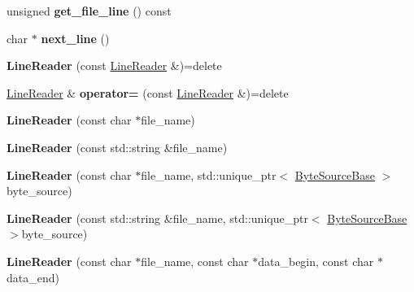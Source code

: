 \begin{DoxyCompactItemize}
\item 
\mbox{\label{classio_1_1_line_reader_a3f3459e22ed8e459238c290050b6722e}} 
unsigned {\bfseries get\+\_\+file\+\_\+line} () const
\item 
\mbox{\label{classio_1_1_line_reader_a97f4e0129611d9da2b8c966ffe670be5}} 
char $\ast$ {\bfseries next\+\_\+line} ()
\item 
\mbox{\label{classio_1_1_line_reader_a84f2957de769bb701eaaddfd8bc004dd}} 
{\bfseries Line\+Reader} (const \hyperlink{classio_1_1_line_reader}{Line\+Reader} \&)=delete
\item 
\mbox{\label{classio_1_1_line_reader_a9ebd7beca16060ffc0ea8df3c0c6ff25}} 
\hyperlink{classio_1_1_line_reader}{Line\+Reader} \& {\bfseries operator=} (const \hyperlink{classio_1_1_line_reader}{Line\+Reader} \&)=delete
\item 
\mbox{\label{classio_1_1_line_reader_a81a75d3f53725d35822f490007520e29}} 
{\bfseries Line\+Reader} (const char $\ast$file\+\_\+name)
\item 
\mbox{\label{classio_1_1_line_reader_ab0eb26f44fa6b18f9c39dfb2561ac882}} 
{\bfseries Line\+Reader} (const std\+::string \&file\+\_\+name)
\item 
\mbox{\label{classio_1_1_line_reader_af4ebb130a7d6c78356573f6d0304266c}} 
{\bfseries Line\+Reader} (const char $\ast$file\+\_\+name, std\+::unique\+\_\+ptr$<$ \hyperlink{classio_1_1_byte_source_base}{Byte\+Source\+Base} $>$byte\+\_\+source)
\item 
\mbox{\label{classio_1_1_line_reader_ab625b3a8001dca811b0e211c6cfc1b28}} 
{\bfseries Line\+Reader} (const std\+::string \&file\+\_\+name, std\+::unique\+\_\+ptr$<$ \hyperlink{classio_1_1_byte_source_base}{Byte\+Source\+Base} $>$byte\+\_\+source)
\item 
\mbox{\label{classio_1_1_line_reader_ad5a65d6f23474884061a77ea858c042b}} 
{\bfseries Line\+Reader} (const char $\ast$file\+\_\+name, const char $\ast$data\+\_\+begin, const char $\ast$data\+\_\+end)

\end{DoxyCompactItemize}
